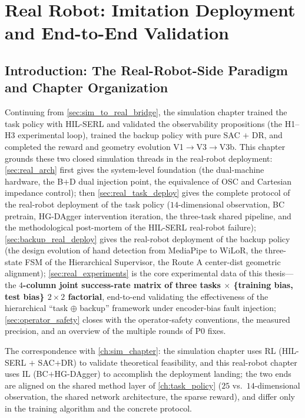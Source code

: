 
\chapter{Real Robot: Imitation Deployment and End-to-End Validation}\label{ch:real_chapter}

\section{Introduction: The Real-Robot-Side Paradigm and Chapter Organization}\label{sec:real_intro}

Continuing from \cref{sec:sim_to_real_bridge}, the simulation chapter trained the task policy with HIL-SERL and validated the observability propositions (the H1--H3 experimental loop), trained the backup policy with pure SAC $+$ DR, and completed the reward and geometry evolution V1$\to$V3$\to$V3b. This chapter grounds these two closed simulation threads in the real-robot deployment: \cref{sec:real_arch} first gives the system-level foundation (the dual-machine hardware, the B$+$D dual injection point, the equivalence of OSC and Cartesian impedance control); then \cref{sec:real_task_deploy} gives the complete protocol of the real-robot deployment of the task policy ($14$-dimensional observation, BC pretrain, HG-DAgger intervention iteration, the three-task shared pipeline, and the methodological post-mortem of the HIL-SERL real-robot failure); \cref{sec:backup_real_deploy} gives the real-robot deployment of the backup policy (the design evolution of hand detection from MediaPipe to WiLoR, the three-state FSM of the Hierarchical Supervisor, the Route A center-dist geometric alignment); \cref{sec:real_experiments} is the core experimental data of this thesis---the \textbf{$4$-column joint success-rate matrix of three tasks $\times$ \{training bias, test bias\} $2\times2$ factorial}, end-to-end validating the effectiveness of the hierarchical ``task $\oplus$ backup'' framework under encoder-bias fault injection; \cref{sec:operator_safety} closes with the operator-safety conventions, the measured precision, and an overview of the multiple rounds of P0 fixes.

The correspondence with \cref{ch:sim_chapter}: the simulation chapter uses RL (HIL-SERL $+$ SAC$+$DR) to validate theoretical feasibility, and this real-robot chapter uses IL (BC$+$HG-DAgger) to accomplish the deployment landing; the two ends are aligned on the shared method layer of \cref{ch:task_policy} ($25$ vs.\ $14$-dimensional observation, the shared network architecture, the sparse reward), and differ only in the training algorithm and the concrete protocol.


